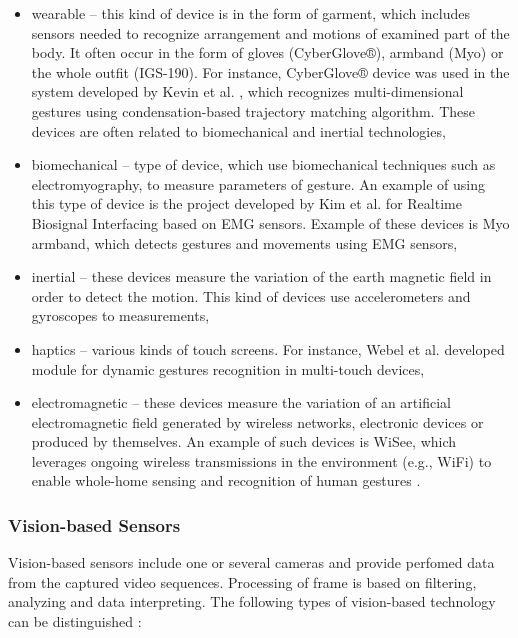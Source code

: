\begin{itemize}

\item wearable -- this kind of device is in the form of garment, which includes sensors needed to recognize arrangement and motions of examined part of the body. It often occur in the form of gloves (CyberGlove®), armband (Myo) or the whole outfit (IGS-190). For instance, CyberGlove® device was used in the system developed by Kevin et al. \cite{KevinCyberGloves}, which recognizes multi-dimensional gestures using condensation-based trajectory matching algorithm. These devices are often related to biomechanical and inertial technologies, 

\item biomechanical -- type of device, which use biomechanical techniques such as electromyography, to measure parameters of gesture. An example of using this type of device is the project developed by Kim et al. \cite{Kim:2008:EHG:1378773.1378778} for Realtime Biosignal Interfacing based on EMG sensors. Example of these devices is Myo armband, which detects gestures and movements using EMG sensors,

\item inertial -- these devices measure the variation of the earth magnetic field in order to detect the motion. This kind of devices use accelerometers \cite{LiuAccelerometer} and gyroscopes \cite{TUD-CS-2009-0292} to measurements,

\item haptics -- various kinds of touch screens. For instance, Webel et al. \cite{conf/vrst/WebelKZ08} developed module for dynamic gestures recognition in multi-touch devices,

\item electromagnetic -- these devices measure the variation of an artificial electromagnetic field generated by wireless networks, electronic devices or produced by themselves. An example of such devices is WiSee, which leverages ongoing wireless transmissions in the environment (e.g., WiFi) to enable whole-home sensing and recognition of human gestures \cite{Pu:2013:WGR:2500423.2500436}.

\end{itemize}

\subsubsection{Vision-based Sensors}

Vision-based sensors include one or several cameras and provide perfomed data from the captured video sequences. Processing of frame is based on filtering, analyzing and data interpreting. The following types of vision-based technology can be distinguished \cite{kaaniche2009human}\cite{Wu:1999:VGR:647591.728702}:

